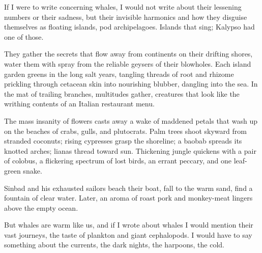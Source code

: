 
If I were to write concerning whales, I would not write about their
lessening numbers or their sadness, but their invisible harmonics and
how they disguise themselves as floating islands, pod archipelagoes.
Islands that sing; Kalypso had one of those.

They gather the secrets that flow away from continents on their drifting
shores, water them with spray from the reliable geysers of their
blowholes. Each island garden greens in the long salt years, tangling
threads of root and rhizome prickling through cetacean skin into
nourishing blubber, dangling into the sea. In the mat of trailing
branches, multitudes gather, creatures that look like the writhing
contents of an Italian restaurant menu.

The mass insanity of flowers casts away a wake of maddened petals that
wash up on the beaches of crabs, gulls, and plutocrats. Palm trees shoot
skyward from stranded coconuts; rising cypresses grasp the shoreline; a
baobab spreads its knotted arches; lianas thread toward sun. Thickening
jungle quickens with a pair of colobus, a flickering spectrum of lost
birds, an errant peccary, and one leaf-green snake.

Sinbad and his exhausted sailors beach their boat, fall to the warm
sand, find a fountain of clear water. Later, an aroma of roast pork and
monkey-meat lingers above the empty ocean.

But whales are warm like us, and if I wrote about whales I would mention
their vast journeys, the taste of plankton and giant cephalopods. I
would have to say something about the currents, the dark nights, the
harpoons, the cold.

